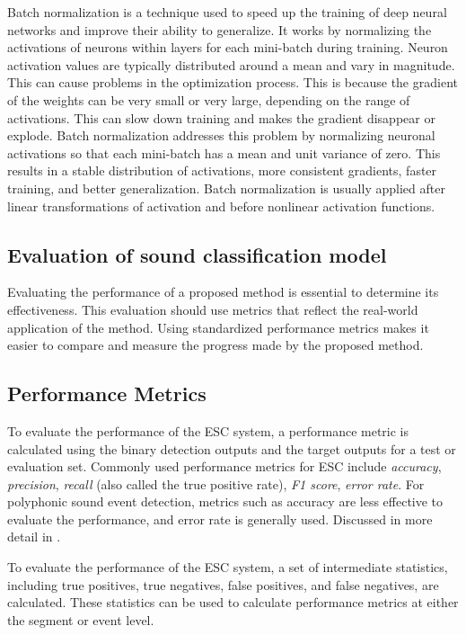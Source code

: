 Batch normalization \cite{ioffe2015batch} is a technique used to speed up the training of deep neural networks and improve their ability to generalize. It works by normalizing the activations of neurons within layers for each mini-batch during training. Neuron activation values are typically distributed around a mean and vary in magnitude. This can cause problems in the optimization process. This is because the gradient of the weights can be very small or very large, depending on the range of activations. This can slow down training and makes the gradient disappear or explode. Batch normalization addresses this problem by normalizing neuronal activations so that each mini-batch has a mean and unit variance of zero. This results in a stable distribution of activations, more consistent gradients, faster training, and better generalization. Batch normalization is usually applied after linear transformations of activation and before nonlinear activation functions. 

\subsection{Evaluation of sound classification model}
Evaluating the performance of a proposed method is essential to determine its effectiveness. This evaluation should use metrics that reflect the real-world application of the method. Using standardized performance metrics makes it easier to compare and measure the progress made by the proposed method. 

\subsection{Performance Metrics}

To evaluate the performance of the ESC system, a performance metric is calculated using the binary detection outputs and the target outputs for a test or evaluation set. Commonly used performance metrics for ESC include \textit{accuracy}, \textit{precision}, \textit{recall} (also called the true positive rate), \textit{F1 score}, \textit{error rate}.  For polyphonic sound event detection, metrics such as accuracy are less effective to evaluate the performance, and error rate is generally used. Discussed in more detail in \cite{mesaros2016metrics}.

To evaluate the performance of the ESC system, a set of intermediate statistics, including true positives, true negatives, false positives, and false negatives, are calculated. These statistics can be used to calculate performance metrics at either the segment or event level.

